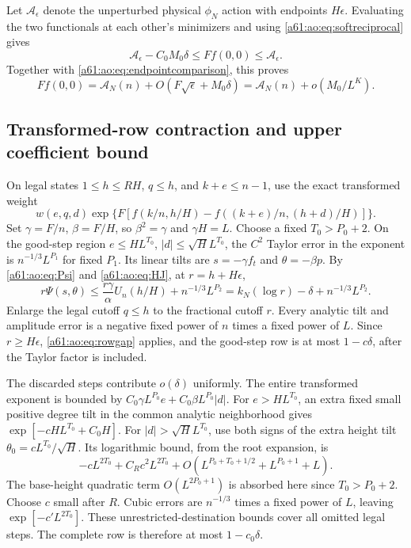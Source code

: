 \documentclass[11pt,letterpaper]{article}
\numberwithin{equation}{section}
\theoremstyle{remark}\newtheorem{remark}[theorem]{Remark}
\newcommand{\A}{\mathcal A}
\begin{document}
Let $\A_\epsilon$ denote the unperturbed physical $\phi_N$ action
with endpoints $H\epsilon$. Evaluating the two functionals at each
other's minimizers and using \eqref{a61:ao:eq:softreciprocal} gives
\[
 \A_\epsilon-C_0M_0\delta\le Ff(0,0)\le\A_\epsilon.
\]
Together with \eqref{a61:ao:eq:endpointcomparison}, this proves
\begin{equation}\label{a61:ao:eq:calibrationcomparison}
 Ff(0,0)=\A_N(n)+O(F\sqrt\epsilon+M_0\delta)
 =\A_N(n)+o(M_0/L^K).
\end{equation}

\subsection{Transformed-row contraction and upper coefficient bound}
On legal states $1\le h\le RH$, $q\le h$, and $k+e\le n-1$, use the
exact transformed weight
\[
 w(e,q,d)\exp\{F[f(k/n,h/H)-f((k+e)/n,(h+d)/H)]\}.
\]
Set $\gamma=F/n$, $\beta=F/H$, so $\beta^2=\gamma$ and $\gamma H=L$.
Choose a fixed $T_0>P_0+2$. On the good-step region
$e\le HL^{T_0}$, $|d|\le\sqrt H L^{T_0}$, the $C^2$ Taylor error in
the exponent is $n^{-1/3}L^{P_1}$ for fixed $P_1$. Its linear tilts
are $s=-\gamma f_t$ and $\theta=-\beta p$. By
\eqref{a61:ao:eq:Psi} and \eqref{a61:ao:eq:HJ}, at $r=h+H\epsilon$,
\[
 r\Psi(s,\theta)\le\frac{r\gamma}{\alpha}U_n(h/H)
 +n^{-1/3}L^{P_2}
 =k_N(\log r)-\delta+n^{-1/3}L^{P_2}.
\]
Enlarge the legal cutoff $q\le h$ to the fractional cutoff $r$.
Every analytic tilt and amplitude error is a negative fixed power of
$n$ times a fixed power of $L$. Since $r\ge H\epsilon$,
\eqref{a61:ao:eq:rowgap} applies, and the good-step row is at most
$1-c\delta$, after the Taylor factor is included.

The discarded steps contribute $o(\delta)$ uniformly. The entire
transformed exponent is bounded by
$C_0\gamma L^{P_0}e+C_0\beta L^{P_0}|d|$.
For $e>HL^{T_0}$, an extra fixed small positive degree tilt in the
common analytic neighborhood gives
$\exp[-cHL^{T_0}+C_0H]$. For $|d|>\sqrt H L^{T_0}$, use both signs
of the extra height tilt $\theta_0=cL^{T_0}/\sqrt H$. Its logarithmic
bound, from the root expansion, is
\[
 -cL^{2T_0}+C_Rc^2L^{2T_0}
 +O(L^{P_0+T_0+1/2}+L^{P_0+1}+L).
\]
The base-height quadratic term $O(L^{2P_0+1})$ is absorbed here since
$T_0>P_0+2$. Choose $c$ small after $R$. Cubic errors are
$n^{-1/3}$ times a fixed power of $L$, leaving
$\exp[-c'L^{2T_0}]$. These unrestricted-destination bounds cover all
omitted legal steps. The complete row is therefore at most
$1-c_0\delta$.
\end{document}
